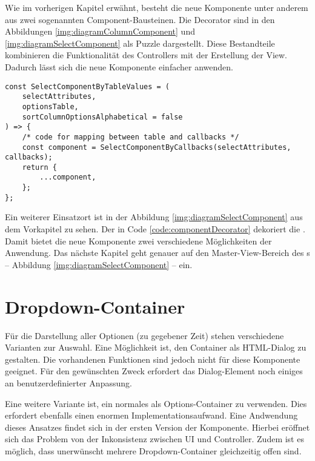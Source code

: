 Wie im vorherigen Kapitel erwähnt, besteht die neue Komponente unter anderem aus zwei sogenannten Component-Bausteinen. 
Die Decorator sind in den Abbildungen \ref{img:diagramColumnComponent} und \ref{img:diagramSelectComponent} als Puzzle dargestellt. 
Diese Bestandteile kombinieren die Funktionalität des Controllers mit der Erstellung der View. 
Dadurch lässt sich die neue Komponente einfacher anwenden. 

\begin{lstlisting}[style = htmlcssjs, caption = \codestyle{SelectComponentByTableValue} dekoriert \codestyle{SelectComponentByCallback}, label = code:componentDecorator]
const SelectComponentByTableValues = (
    selectAttributes,
    optionsTable,
    sortColumnOptionsAlphabetical = false
) => {
    /* code for mapping between table and callbacks */
    const component = SelectComponentByCallbacks(selectAttributes, callbacks);
    return {
        ...component,
    };
};
\end{lstlisting}

Ein weiterer Einsatzort ist in der Abbildung \ref{img:diagramSelectComponent} aus dem Vorkapitel zu sehen. 
Der  in Code \ref{code:componentDecorator} dekoriert die . 
Damit bietet die neue Komponente zwei verschiedene Möglichkeiten der Anwendung. 
Das nächste Kapitel geht genauer auf den Master-View-Bereich des s – Abbildung \ref{img:diagramSelectComponent} – ein. 


\section{Dropdown-Container}
\label{sec:dropdownContainer}

Für die Darstellung aller Optionen (zu gegebener Zeit) stehen verschiedene Varianten zur Auswahl. 
Eine Möglichkeit ist, den Container als HTML-Dialog zu gestalten. 
Die vorhandenen Funktionen sind jedoch nicht für diese Komponente geeignet. 
Für den gewünschten Zweck erfordert das Dialog-Element noch einiges an benutzerdefinierter Anpassung. 

Eine weitere Variante ist, ein normales  als Options-Container zu verwenden. 
Dies erfordert ebenfalls einen enormen Implementationsaufwand. 
Eine Andwendung dieses Ansatzes findet sich in der ersten Version der Komponente. 
Hierbei eröffnet sich das Problem von der Inkonsistenz zwischen UI und Controller. 
Zudem ist es möglich, dass unerwünscht mehrere Dropdown-Container gleichzeitig offen sind. 

